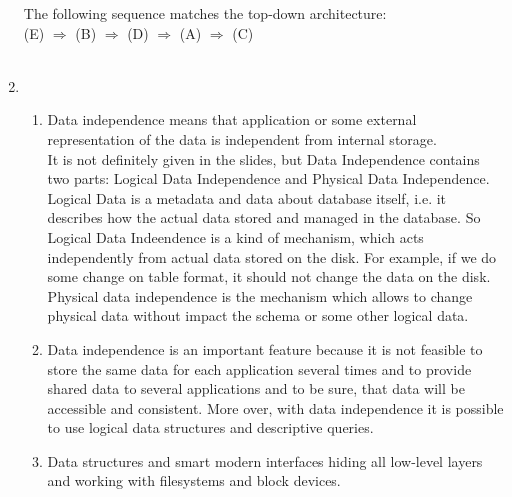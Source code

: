 \documentclass[10pt]{article}
\begin{document}
\begin{enumerate}[label=\arabic*.]
        The following sequence matches the top-down architecture:\\
        (E) $\Rightarrow$ (B) $\Rightarrow$ (D) $\Rightarrow$ (A) $\Rightarrow$ (C)\\\\
      \item
      	\begin{enumerate}[label=\alph*.]
          \item Data independence means that application or some external representation of
          the data is independent from internal storage.\\
          It is not definitely given in the slides, but Data Independence contains
          two parts: Logical Data Independence and Physical Data Independence. Logical Data
          is a metadata and data about database itself, i.e. it describes how the actual
          data stored and managed in the database. So Logical Data Indeendence is a kind of
          mechanism, which acts independently from actual data stored on the disk. For example,
          if we do some change on table format, it should not change the data on the disk.\\
          Physical data independence is the mechanism which allows to change physical data
          without impact the schema or some other logical data.\\
          \item Data independence is an important feature because it is not feasible to store
          the same data for each application several times and to provide shared data to
          several applications and to be sure, that data will be accessible and consistent.
          More over, with data independence it is possible to use logical data structures
          and descriptive queries.\\
          \item Data structures and smart modern interfaces hiding all low-level layers and working
        with filesystems and block devices.
        \end{enumerate}
  \end{enumerate}
\end{document}
